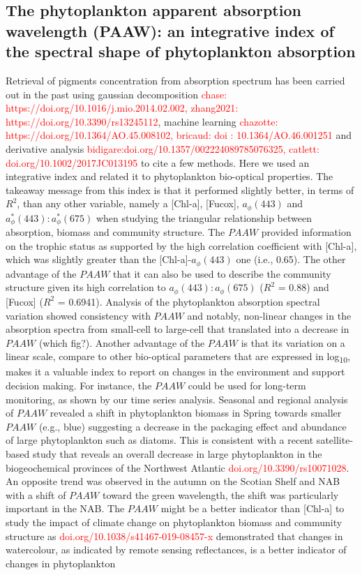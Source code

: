 \documentclass[utf8]{frontiersSCNS} %
\begin{document}
\subsection{The phytoplankton apparent absorption wavelength (PAAW): an integrative index of the spectral shape of phytoplankton absorption}

Retrieval of pigments concentration from absorption spectrum has been carried out in the past using gaussian decomposition \citep{hoepffner1991,chase2013,zhang2021} \textcolor{red}{chase: https://doi.org/10.1016/j.mio.2014.02.002, zhang2021: https://doi.org/10.3390/rs13245112}, machine learning \citep{chazottes2006,bricaud2007}  \textcolor{red}{chazotte: https://doi.org/10.1364/AO.45.008102, bricaud: doi : 10.1364/AO.46.001251} and derivative analysis \citep{bidigare1989,Catlett2017,} \textcolor{red}{bidigare:doi.org/10.1357/002224089785076325, catlett:  doi.org/10.1002/2017JC013195} to cite a few methods. Here we used an integrative index and related it to phytoplankton bio-optical properties. The takeaway message from this index is that it performed slightly better, in terms of $R^2$, than any other variable, namely a [Chl-a], [Fucox], $a_\phi(443)$ and $a^*_\phi(443):a^*_\phi(675)$ when studying the triangular relationship between absorption, biomass and community structure. The $PAAW$ provided information on the trophic status as supported by the high correlation coefficient with [Chl-a], which was slightly greater than the [Chl-a]-$a_\phi(443)$ one (i.e., 0.65). The other advantage of the $PAAW$ that it can also be used to describe the community structure given its high correlation to $a_\phi(443):a_\phi(675)$ ($R^2$ = 0.88) and [Fucox] ($R^2$ = 0.6941).  Analysis of the phytoplankton absorption spectral variation showed consistency with $PAAW$ and notably, non-linear changes in the absorption spectra from small-cell to large-cell that translated into a decrease in $PAAW$ (which fig?). Another advantage of the $PAAW$ is that its variation on a linear scale, compare to other bio-optical parameters that are expressed in log\textsubscript{10}, makes it a valuable index to report on changes in the environment and support decision making. For instance, the $PAAW$ could be used for long-term monitoring, as shown by our time series analysis. Seasonal and regional analysis of $PAAW$ revealed a shift in phytoplankton biomass in Spring towards smaller $PAAW$ (e.g., blue) suggesting a decrease in the packaging effect and abundance of large phytoplankton such as diatoms. This is consistent with a recent satellite-based study that reveals an overall decrease in large phytoplankton in the biogeochemical provinces of the Northwest Atlantic \citep{liu2018} \textcolor{red}{doi.org/10.3390/rs10071028}. An opposite trend was observed in the autumn on the Scotian Shelf and NAB with a shift of $PAAW$ toward the green wavelength, the shift was particularly important in the NAB. The $PAAW$ might be a better indicator than [Chl-a] to study the impact of climate change on phytoplankton biomass and community structure as \citep{dutkiewicz2019} \textcolor{red}{doi.org/10.1038/s41467-019-08457-x} demonstrated that changes in watercolour, as indicated by remote sensing reflectances, is a better indicator of changes in phytoplankton 
\end{document}
